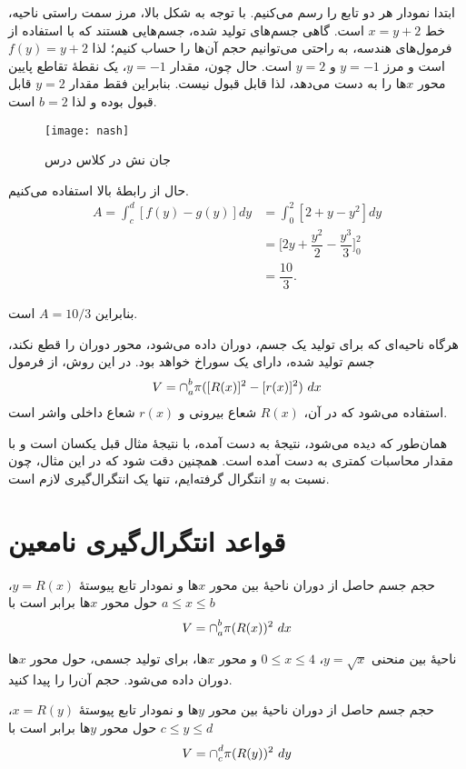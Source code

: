 \begin{solution}
ابتدا نمودار هر دو تابع را رسم می‌کنیم.
با توجه به شکل بالا، 
مرز سمت راستی ناحیه، خط $x=y+2$ است.  گاهی جسم‌های تولید شده، جسم‌هایی هستند که با استفاده از فرمول‌های هندسه، به راحتی می‌توانیم حجم آن‌ها را حساب کنیم؛ 
لذا $f(y)=y+2$ است و مرز 
$y=-1$ و $y=2$ 
است.
حال چون، مقدار $y=-1$، یک نقطهٔ تقاطع پایین محور $x$ها را به دست 
می‌دهد، لذا قابل قبول نیست. بنابراین فقط مقدار $y=2$ قابل قبول بوده و لذا
$b=2$ 
است. 
\begin{figure}[!t]
\centering\texttt{[image: nash]}
\caption{
جان نش در کلاس درس
}\label{nash}
\end{figure}

حال از رابطهٔ بالا استفاده می‌کنیم.
\begin{align*}
A=\int_c^d [f(y)-g(y)] dy&=\int_0^2[2+y-y^2] dy\\[2mm]
&=\Bigg[2y+\dfrac{y^2}{2}-\dfrac{y^3}{3}\Bigg]_{0}^{2}\\[2mm]
&=\dfrac{10}{3}.
\end{align*}

بنابراین $A=10/3$ است. 
\end{solution}
هرگاه ناحیه‌ای که برای تولید یک جسم، دوران داده می‌شود، محور دوران را قطع نکند، جسم تولید شده، دارای یک سوراخ خواهد بود. در این روش، از فرمول
\begin{align}\label{10eq3}
V=\mathbin{\mathstrut{\cap}}_a^b \pi ([R(x)]^2-[r(x)]^2)\ d x
\end{align}
استفاده می‌شود که در آن، $R(x)$ 
شعاع بیرونی
 و
 $r(x)$
 شعاع داخلی واشر
 است. 
 
همان‌طور که دیده می‌شود، نتیجهٔ به دست آمده، با نتیجهٔ مثال قبل
یکسان است و با مقدار محاسبات کمتری به دست آمده است. همچنین دقت شود که در این مثال، چون نسبت به $y$ انتگرال گرفته‌ایم، تنها یک 
انتگرال‌گیری لازم است. 
 

\section{قواعد انتگرال‌گیری نامعین}
حجم جسم حاصل از دوران ناحیهٔ بین محور $x$ها و  نمودار تابع پیوستهٔ $y=R(x)$،
$a\leq x\leq b$
 حول محور $x$ها برابر است با
 \begin{align}\label{c2eq1}
 V=\mathbin{\mathstrut{\cap}}_a^b \pi (R(x))^2 \ d x
 \end{align}
\begin{example}
ناحیهٔ بین منحنی $y=\sqrt{x}$، 
$0\leq x\leq 4$
و محور $x$ها، برای تولید جسمی، حول محور $x$ها دوران داده می‌شود. حجم آن‌‌را
را پیدا کنید.
\end{example}
حجم جسم حاصل از دوران ناحیهٔ بین محور $y$ها و  نمودار تابع پیوستهٔ $x=R(y)$،
$c\leq y\leq d$
 حول محور $y$ها برابر است با
 \begin{align}\label{c2eq2}
 V=\mathbin{\mathstrut{\cap}}_c^d \pi (R(y))^2 \ d y
 \end{align}
